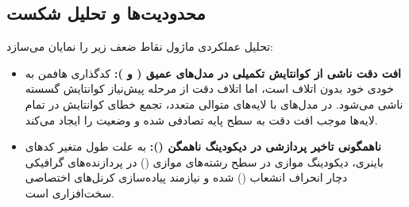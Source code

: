 \subsection{محدودیت‌ها و تحلیل شکست}
تحلیل عملکردی ماژول نقاط ضعف زیر را نمایان می‌سازد:
\begin{itemize}
    \item \textbf{افت دقت ناشی از کوانتایش تکمیلی در مدل‌های عمیق ( و ):} کدگذاری هافمن به خودی خود بدون اتلاف است، اما اتلاف دقت از مرحله پیش‌نیاز کوانتایش گسسته ناشی می‌شود. در مدل‌های با لایه‌های متوالی متعدد، تجمع خطای کوانتایش در تمام لایه‌ها موجب افت دقت به سطح پایه تصادفی شده و وضعیت  را ایجاد می‌کند.
    \item \textbf{ناهمگونی تاخیر پردازشی در دیکودینگ ناهمگن ():} به علت طول متغیر کدهای باینری، دیکودینگ موازی در سطح رشته‌های موازی () در پردازنده‌های گرافیکی دچار انحراف انشعاب () شده و نیازمند پیاده‌سازی کرنل‌های اختصاصی سخت‌افزاری است.
\end{itemize}
